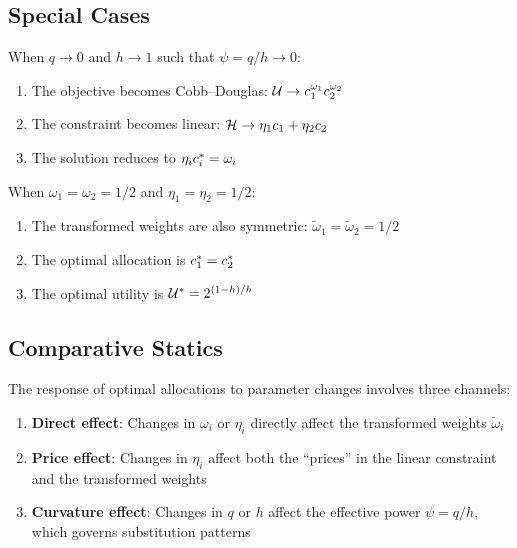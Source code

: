 \subsection{Special Cases}
\label{subsec:ces-ces-special}

\begin{proposition}
\label{prop:cd-limit}
When $q \to 0$ and $h \to 1$ such that $\psi = q/h \to 0$:
\begin{enumerate}[label=(\roman*)]
    \item The objective becomes Cobb--Douglas: $\mathcal{U} \to c_1^{\omega_1} c_2^{\omega_2}$
    \item The constraint becomes linear: $\mathcal{H} \to \eta_1 c_1 + \eta_2 c_2$
    \item The solution reduces to $\eta_i c_i^{*} = \omega_i$
\end{enumerate}
\end{proposition}

\begin{proposition}
\label{prop:symmetric}
When $\omega_1 = \omega_2 = 1/2$ and $\eta_1 = \eta_2 = 1/2$:
\begin{enumerate}[label=(\roman*)]
    \item The transformed weights are also symmetric: $\tilde{\omega}_1 = \tilde{\omega}_2 = 1/2$
    \item The optimal allocation is $c_1^{*} = c_2^{*}$
    \item The optimal utility is $\mathcal{U}^{*} = 2^{(1-h)/h}$
\end{enumerate}
\end{proposition}

\subsection{Comparative Statics}
\label{subsec:ces-ces-compar}

The response of optimal allocations to parameter changes involves three channels:

\begin{enumerate}[label=\textbf{(\arabic*)}]
    \item \textbf{Direct effect}: Changes in $\omega_i$ or $\eta_i$ directly affect the transformed weights $\tilde{\omega}_i$
    
    \item \textbf{Price effect}: Changes in $\eta_i$ affect both the ``prices'' in the linear constraint and the transformed weights
    
    \item \textbf{Curvature effect}: Changes in $q$ or $h$ affect the effective power $\psi = q/h$, which governs substitution patterns
\end{enumerate}

